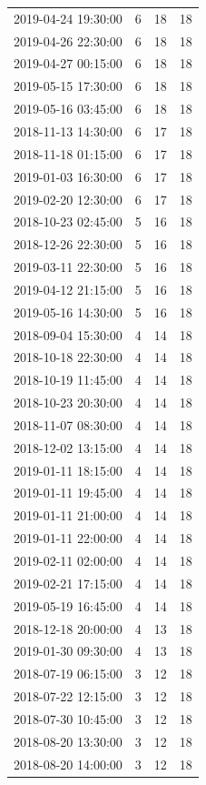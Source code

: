 \begin{tabular}{lrrr}
2019-04-24 19:30:00 & 6 & 18 & 18 \\
2019-04-26 22:30:00 & 6 & 18 & 18 \\
2019-04-27 00:15:00 & 6 & 18 & 18 \\
2019-05-15 17:30:00 & 6 & 18 & 18 \\
2019-05-16 03:45:00 & 6 & 18 & 18 \\
2018-11-13 14:30:00 & 6 & 17 & 18 \\
2018-11-18 01:15:00 & 6 & 17 & 18 \\
2019-01-03 16:30:00 & 6 & 17 & 18 \\
2019-02-20 12:30:00 & 6 & 17 & 18 \\
2018-10-23 02:45:00 & 5 & 16 & 18 \\
2018-12-26 22:30:00 & 5 & 16 & 18 \\
2019-03-11 22:30:00 & 5 & 16 & 18 \\
2019-04-12 21:15:00 & 5 & 16 & 18 \\
2019-05-16 14:30:00 & 5 & 16 & 18 \\
2018-09-04 15:30:00 & 4 & 14 & 18 \\
2018-10-18 22:30:00 & 4 & 14 & 18 \\
2018-10-19 11:45:00 & 4 & 14 & 18 \\
2018-10-23 20:30:00 & 4 & 14 & 18 \\
2018-11-07 08:30:00 & 4 & 14 & 18 \\
2018-12-02 13:15:00 & 4 & 14 & 18 \\
2019-01-11 18:15:00 & 4 & 14 & 18 \\
2019-01-11 19:45:00 & 4 & 14 & 18 \\
2019-01-11 21:00:00 & 4 & 14 & 18 \\
2019-01-11 22:00:00 & 4 & 14 & 18 \\
2019-02-11 02:00:00 & 4 & 14 & 18 \\
2019-02-21 17:15:00 & 4 & 14 & 18 \\
2019-05-19 16:45:00 & 4 & 14 & 18 \\
2018-12-18 20:00:00 & 4 & 13 & 18 \\
2019-01-30 09:30:00 & 4 & 13 & 18 \\
2018-07-19 06:15:00 & 3 & 12 & 18 \\
2018-07-22 12:15:00 & 3 & 12 & 18 \\
2018-07-30 10:45:00 & 3 & 12 & 18 \\
2018-08-20 13:30:00 & 3 & 12 & 18 \\
2018-08-20 14:00:00 & 3 & 12 & 18 \\

\end{tabular}
